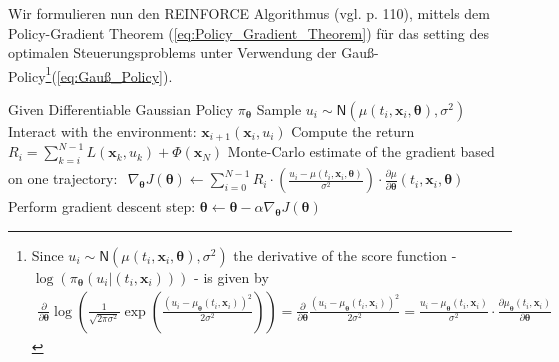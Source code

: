 \documentclass[a4paper, 12pt]{scrartcl}
\begin{document}
Wir formulieren nun den REINFORCE Algorithmus 
(vgl. \cite{Plaat_RL} p. 110),
mittels dem Policy-Gradient Theorem (\ref{eq:Policy_Gradient_Theorem})
für das setting des optimalen Steuerungsproblems unter Verwendung 
der Gauß-Policy\footnote{
    Since $u_i \sim \mathsf{N}(\mu(t_i, \bm{x}_i, \bm{\theta}), \sigma^2)$ 
    the derivative of the score function -
    $%
    \log
    \left(
        \pi_{\bm{\theta}} (u_i | (t_i, \bm{x}_i))
    \right)$
    - 
    is given by
    \begin{align*}
        \frac{\partial}{\partial \bm{\theta}} 
        \log
        \left(
            \frac{1}{\sqrt{2\pi \sigma^2}}
            \exp
            \left(
                \frac{(u_i - \mu_{\bm{\theta}}(t_i,\bm{x}_i))^2}{2\sigma^2}
            \right)
        \right)
        =
        \frac{\partial}{\partial \bm{\theta}} 
        \frac{(u_i - \mu_{\bm{\theta}}(t_i,\bm{x}_i))^2}{2\sigma^2}
        =
        \frac{u_i - \mu_{\bm{\theta}}(t_i,\bm{x}_i)}{\sigma^2} 
        \cdot 
        \frac{\partial \mu_{\bm{\theta}}(t_i,\bm{x}_i)}{\partial \bm{\theta}} 
    \end{align*}   
}(\ref{eq:Gauß_Policy}).

\begin{algorithm}
    \caption{REINFORCE}\label{alg:REINFORCE}
    \begin{algorithmic}[1]
        \State Given Differentiable Gaussian Policy $\pi_{\bm{\theta}}$
                \State Sample $u_i \sim \mathsf{N}(\mu(t_i, \bm{x}_i, \bm{\theta}), \sigma^2)$
                \State Interact with the environment: $\bm{x}_{i+1}(\bm{x}_i, u_i)$
            \EndFor
            \State Compute the return $R_i = \sum_{k=i}^{N-1} L(\bm{x}_k, u_k) + \Phi(\bm{x}_N)$
            \State Monte-Carlo estimate of the gradient based on one trajectory:
            \State
            $\begin{aligned}
                \nabla_{\bm{\theta}} J(\bm{\theta}) 
                \leftarrow
                \sum_{i=0}^{N-1}
                R_i
                \cdot 
                \left(
                    \frac{u_i - \mu(t_i, \bm{x}_i, \bm{\theta})}{\sigma^2}
                \right)
                \cdot 
                \frac{\partial \mu}{\partial \bm{\theta}}(t_i, \bm{x}_i, \bm{\theta})
            \end{aligned}$
            \State Perform gradient descent step: $\bm{\theta} \leftarrow \bm{\theta} - \alpha \nabla_{\bm{\theta}} J(\bm{\theta})$
        \EndFor
    \end{algorithmic}
\end{algorithm}
\end{document}
